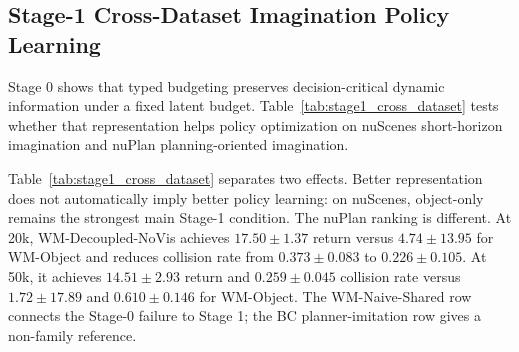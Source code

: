 \documentclass[10pt,journal,compsoc]{IEEEtran}
\begin{document}
\subsection{Stage-1 Cross-Dataset Imagination Policy Learning}
Stage 0 shows that typed budgeting preserves decision-critical dynamic information under a fixed latent budget. Table~\ref{tab:stage1_cross_dataset} tests whether that representation helps policy optimization on nuScenes short-horizon imagination and nuPlan planning-oriented imagination.

Table~\ref{tab:stage1_cross_dataset} separates two effects. Better representation does not automatically imply better policy learning: on nuScenes, object-only remains the strongest main Stage-1 condition. The nuPlan ranking is different. At 20k, WM-Decoupled-NoVis achieves $17.50 \pm 1.37$ return versus $4.74 \pm 13.95$ for WM-Object and reduces collision rate from $0.373 \pm 0.083$ to $0.226 \pm 0.105$. At 50k, it achieves $14.51 \pm 2.93$ return and $0.259 \pm 0.045$ collision rate versus $1.72 \pm 17.89$ and $0.610 \pm 0.146$ for WM-Object. The WM-Naive-Shared row connects the Stage-0 failure to Stage 1; the BC planner-imitation row gives a non-family reference.

\begin{table}[!t]
\caption{Clean Stage-1 DOOR capacity Pareto study on nuPlan 5k. The policy experiment uses horizon 10 and three seeds; the measured cost columns come from the matching repeated-rollout benchmark with batch size 128 and horizon 10. $K=32$ is a compact trade-off rather than a global optimum; $K=64$ is stronger downstream but substantially more memory intensive.}
\label{tab:stage1_capacity_pareto}
\centering
{}
\end{table}
\end{document}
